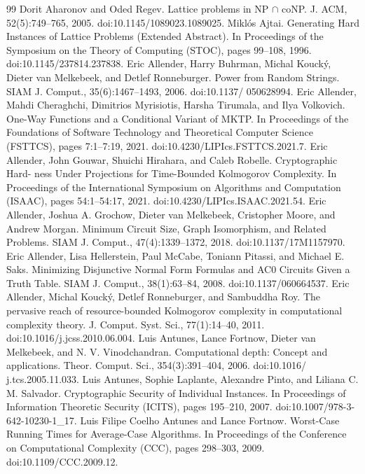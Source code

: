 \begin{thebibliography}{99}
 Dorit Aharonov and Oded Regev. Lattice problems in NP $\cap$ coNP. J. ACM, 52(5):749–765, 2005. doi:10.1145/1089023.1089025.
 Miklós Ajtai. Generating Hard Instances of Lattice Problems (Extended Abstract). In Proceedings of the Symposium on the Theory of Computing (STOC), pages 99–108, 1996. doi:10.1145/237814.237838.
 Eric Allender, Harry Buhrman, Michal Koucký, Dieter van Melkebeek, and Detlef Ronneburger. Power from Random Strings. SIAM J. Comput., 35(6):1467–1493, 2006. doi:10.1137/ 050628994.
 Eric Allender, Mahdi Cheraghchi, Dimitrios Myrisiotis, Harsha Tirumala, and Ilya Volkovich. One-Way Functions and a Conditional Variant of MKTP. In Proceedings of the Foundations of Software Technology and Theoretical Computer Science (FSTTCS), pages 7:1–7:19, 2021. doi:10.4230/LIPIcs.FSTTCS.2021.7.
 Eric Allender, John Gouwar, Shuichi Hirahara, and Caleb Robelle. Cryptographic Hard- ness Under Projections for Time-Bounded Kolmogorov Complexity. In Proceedings of the International Symposium on Algorithms and Computation (ISAAC), pages 54:1–54:17, 2021. doi:10.4230/LIPIcs.ISAAC.2021.54.
 Eric Allender, Joshua A. Grochow, Dieter van Melkebeek, Cristopher Moore, and Andrew Morgan. Minimum Circuit Size, Graph Isomorphism, and Related Problems. SIAM J. Comput., 47(4):1339–1372, 2018. doi:10.1137/17M1157970.
 Eric Allender, Lisa Hellerstein, Paul McCabe, Toniann Pitassi, and Michael E. Saks. Minimizing Disjunctive Normal Form Formulas and AC0 Circuits Given a Truth Table. SIAM J. Comput., 38(1):63–84, 2008. doi:10.1137/060664537.
 Eric Allender, Michal Koucký, Detlef Ronneburger, and Sambuddha Roy. The pervasive reach of resource-bounded Kolmogorov complexity in computational complexity theory. J. Comput. Syst. Sci., 77(1):14–40, 2011. doi:10.1016/j.jcss.2010.06.004.
 Luis Antunes, Lance Fortnow, Dieter van Melkebeek, and N. V. Vinodchandran. Computational depth: Concept and applications. Theor. Comput. Sci., 354(3):391–404, 2006. doi:10.1016/ j.tcs.2005.11.033.
 Luis Antunes, Sophie Laplante, Alexandre Pinto, and Liliana C. M. Salvador. Cryptographic Security of Individual Instances. In Proceedings of Information Theoretic Security (ICITS), pages 195–210, 2007. doi:10.1007/978-3-642-10230-1\_17.
 Luis Filipe Coelho Antunes and Lance Fortnow. Worst-Case Running Times for Average-Case Algorithms. In Proceedings of the Conference on Computational Complexity (CCC), pages 298–303, 2009. doi:10.1109/CCC.2009.12.

\end{thebibliography}
